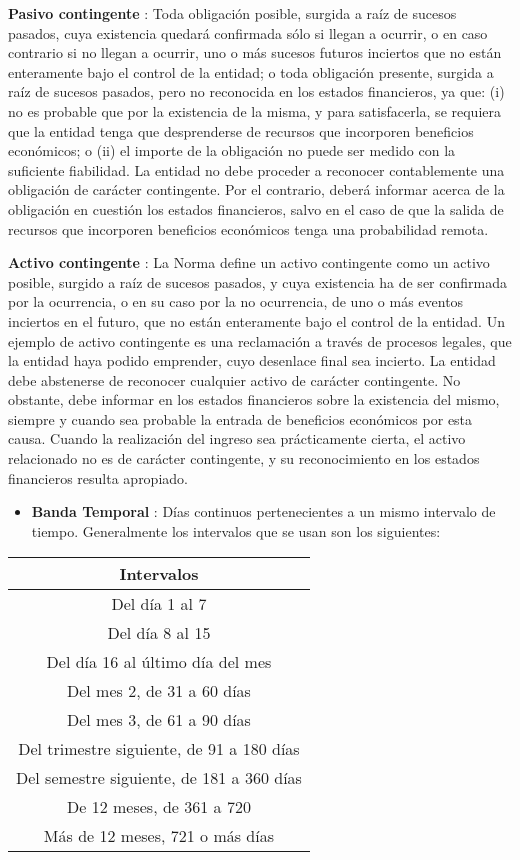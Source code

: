 \documentclass[]{article}
\providecommand{\tightlist}{%
  \setlength{\itemsep}{0pt}\setlength{\parskip}{0pt}}
\begin{document}
\textbf{Pasivo contingente} : Toda obligación posible, surgida a raíz de
sucesos pasados, cuya existencia quedará confirmada sólo si llegan a
ocurrir, o en caso contrario si no llegan a ocurrir, uno o más sucesos
futuros inciertos que no están enteramente bajo el control de la
entidad; o toda obligación presente, surgida a raíz de sucesos pasados,
pero no reconocida en los estados financieros, ya que: (i) no es
probable que por la existencia de la misma, y para satisfacerla, se
requiera que la entidad tenga que desprenderse de recursos que
incorporen beneficios económicos; o (ii) el importe de la obligación no
puede ser medido con la suficiente fiabilidad. La entidad no debe
proceder a reconocer contablemente una obligación de carácter
contingente. Por el contrario, deberá informar acerca de la obligación
en cuestión los estados financieros, salvo en el caso de que la salida
de recursos que incorporen beneficios económicos tenga una probabilidad
remota.

\textbf{Activo contingente} : La Norma define un activo contingente como
un activo posible, surgido a raíz de sucesos pasados, y cuya existencia
ha de ser confirmada por la ocurrencia, o en su caso por la no
ocurrencia, de uno o más eventos inciertos en el futuro, que no están
enteramente bajo el control de la entidad. Un ejemplo de activo
contingente es una reclamación a través de procesos legales, que la
entidad haya podido emprender, cuyo desenlace final sea incierto. La
entidad debe abstenerse de reconocer cualquier activo de carácter
contingente. No obstante, debe informar en los estados financieros sobre
la existencia del mismo, siempre y cuando sea probable la entrada de
beneficios económicos por esta causa. Cuando la realización del ingreso
sea prácticamente cierta, el activo relacionado no es de carácter
contingente, y su reconocimiento en los estados financieros resulta
apropiado.

\begin{itemize}
\tightlist
\item
  \textbf{Banda Temporal} : Días continuos pertenecientes a un mismo
  intervalo de tiempo. Generalmente los intervalos que se usan son los
  siguientes:
\end{itemize}

\begin{longtable}[]{@{}c@{}}
\toprule
Intervalos\tabularnewline
\midrule
\endhead
Del día 1 al 7\tabularnewline
Del día 8 al 15\tabularnewline
Del día 16 al último día del mes\tabularnewline
Del mes 2, de 31 a 60 días\tabularnewline
Del mes 3, de 61 a 90 días\tabularnewline
Del trimestre siguiente, de 91 a 180 días\tabularnewline
Del semestre siguiente, de 181 a 360 días\tabularnewline
De 12 meses, de 361 a 720\tabularnewline
Más de 12 meses, 721 o más días\tabularnewline
\bottomrule
\end{longtable}
\end{document}

